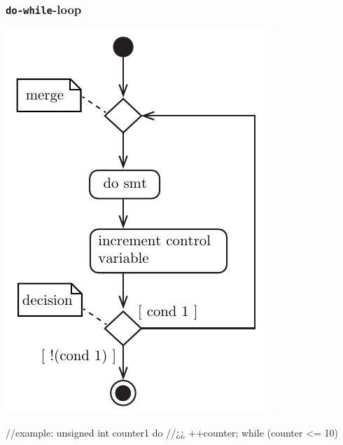 \subsubsection{\texttt{do-while}-loop}
\begin{minipage}{.55\textwidth}
\centering
\includegraphics[width=0.58\linewidth]{01_Basics/figures/uml/IterationStatement-02-UML-do-while.pdf}
\label{fig:ch01_Basics_UML_IterationStatement-01-for}
\end{minipage}
\begin{minipage}{.25\textwidth}
\begin{CPPCode}
//example:
unsigned int counter{1}
do
{
    //¿¿
    ++counter;
} while (counter <= 10)
\end{CPPCode}
\end{minipage}
\vspace{0.5cm}





